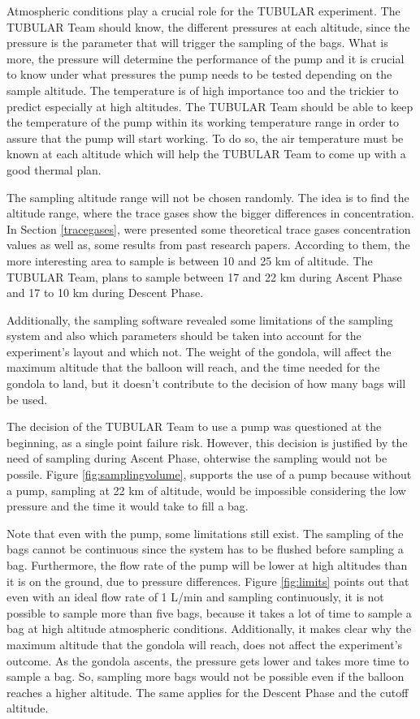 Atmospheric conditions play a crucial role for the TUBULAR experiment. The TUBULAR Team should know, the different pressures at each altitude, since the pressure is the parameter that will trigger the sampling of the bags. What is more, the pressure will determine the performance of the pump and it is crucial to know under what pressures the pump needs to be tested depending on the sample altitude. The temperature is of high importance too and the trickier to predict especially at high altitudes. The TUBULAR Team should be able to keep the temperature of the pump within its working temperature range in order to assure that the pump will start working. To do so, the air temperature must be known at each altitude which will help the TUBULAR Team to come up with a good thermal plan. 

The sampling altitude range will not be chosen randomly. The idea is to find the altitude range, where the trace gases show the bigger differences in concentration. In Section \ref{tracegases}, were presented some theoretical trace gases concentration values as well as, some results from past research papers. According to them, the more interesting area to sample is between 10 and 25 km of altitude. The TUBULAR Team, plans to sample between 17 and 22 km during Ascent Phase and 17 to 10 km during Descent Phase. 

Additionally, the sampling software revealed some limitations of the sampling system and also which parameters should be taken into account for the experiment's layout and which not. 
The weight of the gondola, will affect the maximum altitude that the balloon will reach, and the time needed for the gondola to land, but it doesn't contribute to the decision of how many bags will be used.

The decision of the TUBULAR Team to use a pump was questioned at the beginning, as a single point failure risk. However, this decision is justified by the need of sampling during Ascent Phase, ohterwise the sampling would not be possile.  Figure \ref{fig:samplingvolume}, supports the use of a pump because without a pump, sampling at 22 km of altitude, would be impossible considering the low pressure and the time it would take to fill a bag. 

Note that even with the pump, some limitations still exist. The sampling of the bags cannot be continuous since the system has to be flushed before sampling a bag. Furthermore, the flow rate of the pump will be lower at high altitudes than it is on the ground, due to pressure differences. Figure \ref{fig:limits} points out that even with an ideal flow rate of 1 L/min and sampling continuously, it is not possible to sample more than five bags, because it takes a lot of time to sample a bag at high altitude atmospheric conditions. Additionally, it makes clear why the maximum altitude that the gondola will reach, does not affect the experiment's outcome. As the gondola ascents, the pressure gets lower and takes more time to sample a bag. So, sampling more bags would not be possible even if the balloon reaches a higher altitude. The same applies for the Descent Phase and the cutoff altitude. 

